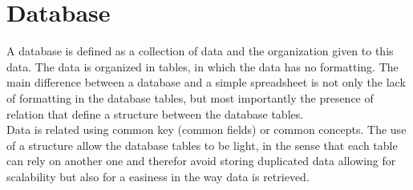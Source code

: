 \documentclass[../main.tex]{subfiles}
\begin{document}
\section{Database}
A database is defined as a collection of data and the organization given to this data. The data is organized in tables, in which the data has no formatting. The main difference between a database and a simple spreadsheet is not only the lack of formatting in the database tables, but most importantly the presence of relation that define a structure between the database tables.\\
Data is related using common key (common fields) or common concepts. The use of a structure allow the database tables to be light, in the sense that each table can rely on another one and therefor avoid storing duplicated data allowing for scalability but also for a easiness in the way data is retrieved. 
\end{document}
